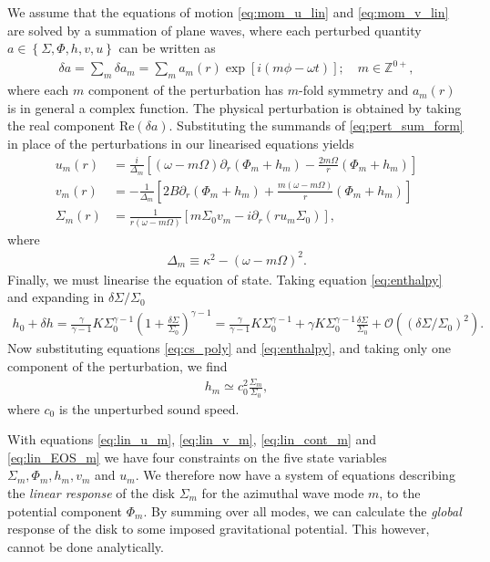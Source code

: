 We assume that the equations of motion \ref{eq:mom_u_lin} and \ref{eq:mom_v_lin} are solved by a summation of plane waves, where each perturbed quantity $a \in \left\{ \Sigma, \Phi, h, v, u \right\}$ can be written as
\begin{align}
    \delta a = \sum_m \delta a_m = \sum_m a_m(r) \exp \left[ i (m\phi - \omega t) \right]; \quad m \in \mathbb{Z}^{0+}, \label{eq:pert_sum_form}
\end{align}
where each $m$ component of the perturbation has $m$-fold symmetry and $a_m(r)$ is in general a complex function.
The physical perturbation is obtained by taking the real component $\mathrm{Re}(\delta a)$.
Substituting the summands of \ref{eq:pert_sum_form} in place of the perturbations in our linearised equations yields
\begin{align}
    u_m (r) &= \frac{i}{\Delta_m} \left[ (\omega - m \Omega) \partial_r (\Phi_m + h_m) - \frac{2 m \Omega}{r} (\Phi_m + h_m) \right] \label{eq:lin_u_m} \\
    v_m (r) &= - \frac{1}{\Delta_m} \left[ 2B \partial_r (\Phi_m + h_m) + \frac{m(\omega - m \Omega)}{r} (\Phi_m + h_m) \right] \label{eq:lin_v_m} \\
    \Sigma_m (r) &= \frac{1}{r(\omega - m \Omega)} \left[ m \Sigma_0 v_m -i \partial_r (r u_m \Sigma_0) \right] \label{eq:lin_cont_m},
\end{align}
where
\begin{align}
    \Delta_m \equiv \kappa^2 - (\omega - m \Omega)^2. \label{eq:def_delta_m}
\end{align}
Finally, we must linearise the equation of state.
Taking equation \ref{eq:enthalpy} and expanding in $\delta \Sigma / \Sigma_0$
\begin{align}
    h_0 + \delta h = \frac{\gamma}{\gamma - 1} K \Sigma_0^{\gamma - 1}(1 + \frac{\delta\Sigma}{\Sigma_0})^{\gamma-1} = \frac{\gamma}{\gamma - 1} K \Sigma_0^{\gamma - 1} + \gamma K \Sigma_0^{\gamma-1} \frac{\delta\Sigma}{\Sigma_0} + \mathcal{O}(\left(\delta\Sigma / \Sigma_0\right)^2).
\end{align}
Now substituting equations \ref{eq:cs_poly} and \ref{eq:enthalpy}, and taking only one component of the perturbation, we find
\begin{align}
    h_m \simeq c_0^2 \frac{\Sigma_m}{\Sigma_0}, \label{eq:lin_EOS_m}
\end{align}
where $c_0$ is the unperturbed sound speed.

With equations \ref{eq:lin_u_m}, \ref{eq:lin_v_m}, \ref{eq:lin_cont_m} and \ref{eq:lin_EOS_m} we have four constraints on the five state variables $\Sigma_m, \Phi_m, h_m, v_m$ and $u_m$.
We therefore now have a system of equations describing the \textit{linear response} of the disk $\Sigma_m$ for the azimuthal wave mode $m$, to the potential component $\Phi_m$.
By summing over all modes, we can calculate the \textit{global} response of the disk to some imposed gravitational potential.
This however, cannot be done analytically.

